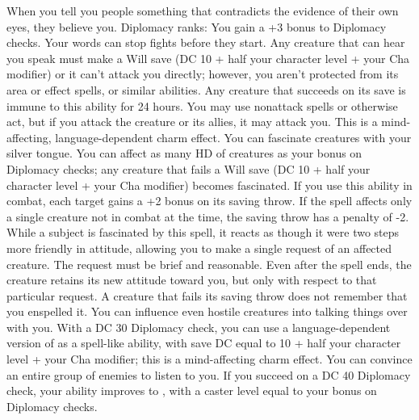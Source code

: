 \skillfeat
{When you tell you people something that contradicts the evidence of their own eyes, they believe you.}
{Diplomacy ranks:}
{You gain a +3 bonus to Diplomacy checks.}
{Your words can stop fights before they start. Any creature that can hear you speak must make a Will save (DC 10 + half your character level + your Cha modifier) or it can't attack you directly; however, you aren't protected from its area or effect spells, or similar abilities. Any creature that succeeds on its save is immune to this ability for 24 hours. You may use nonattack spells or otherwise act, but if you attack the creature or its allies, it may attack you. This is a mind-affecting, language-dependent charm effect.}
{You can fascinate creatures with your silver tongue. You can affect as many HD of creatures as your bonus on Diplomacy checks; any creature that fails a Will save (DC 10 + half your character level + your Cha modifier) becomes fascinated. If you use this ability in combat, each target gains a +2 bonus on its saving throw. If the spell affects only a single creature not in combat at the time, the saving throw has a penalty of -2. While a subject is fascinated by this spell, it reacts as though it were two steps more friendly in attitude, allowing you to make a single request of an affected creature. The request must be brief and reasonable. Even after the spell ends, the creature retains its new attitude toward you, but only with respect to that particular request. A creature that fails its saving throw does not remember that you enspelled it.}
{You can influence even hostile creatures into talking things over with you. With a DC 30 Diplomacy check, you can use a language-dependent version of  as a spell-like ability, with save DC equal to 10 + half your character level + your Cha modifier; this is a mind-affecting charm effect.}
{You can convince an entire group of enemies to listen to you. If you succeed on a DC 40 Diplomacy check, your  ability improves to , with a caster level equal to your bonus on Diplomacy checks.}